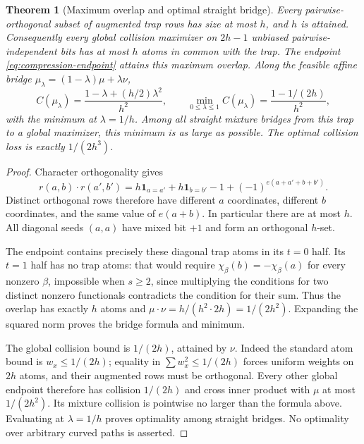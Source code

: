 \documentclass[11pt]{article}
\newtheorem{theorem}{Theorem}[section]
\begin{document}
\begin{theorem}[Maximum overlap and optimal straight bridge]
\label{thm:compression-optimal-overlap}
Every pairwise-orthogonal subset of augmented trap rows has size at most
$h$, and $h$ is attained. Consequently every global collision maximizer
on $2h-1$ unbiased pairwise-independent bits has at most $h$ atoms in
common with the trap. The endpoint \eqref{eq:compression-endpoint}
attains this maximum overlap. Along the feasible affine bridge
$\mu_\lambda=(1-\lambda)\mu+\lambda\nu$,
\[
 C(\mu_\lambda)=\frac{1-\lambda+(h/2)\lambda^2}{h^2},\qquad
 \min_{0\le\lambda\le1}C(\mu_\lambda)
 =\frac{1-1/(2h)}{h^2},
\]
with the minimum at $\lambda=1/h$.
Among all straight mixture bridges from this trap to a global maximizer,
this minimum is as large as possible. The optimal collision loss is
exactly $1/(2h^3)$.
\end{theorem}
\begin{proof}
Character orthogonality gives
\[
 r(a,b)\cdot r(a',b')=
 h\mathbf1_{a=a'}+h\mathbf1_{b=b'}-1+
 (-1)^{e(a+a'+b+b')}.
\]
Distinct orthogonal rows therefore have different $a$ coordinates,
different $b$ coordinates, and the same value of $e(a+b)$.
In particular there are at most $h$. All diagonal seeds $(a,a)$ have
mixed bit $+1$ and form an orthogonal $h$-set.

The endpoint contains precisely these diagonal trap atoms in its $t=0$
half. Its $t=1$ half has no trap atoms: that would require
$\chi_\beta(b)=-\chi_\beta(a)$ for every nonzero $\beta$, impossible
when $s\ge2$, since multiplying the conditions for two distinct nonzero
functionals contradicts the condition for their sum. Thus the overlap
has exactly $h$ atoms and
$\mu\cdot\nu=h/(h^2\cdot2h)=1/(2h^2)$.
Expanding the squared norm proves the bridge formula and minimum.

The global collision bound is $1/(2h)$, attained by $\nu$. Indeed the
standard atom bound is $w_x\le1/(2h)$; equality in
$\sum w_x^2\le1/(2h)$ forces uniform weights on $2h$ atoms, and their
augmented rows must be orthogonal. Every other global endpoint therefore
has collision $1/(2h)$ and cross inner product with $\mu$ at most
$1/(2h^2)$. Its mixture collision is pointwise no larger than the
formula above. Evaluating at $\lambda=1/h$ proves optimality among
straight bridges. No optimality over arbitrary curved paths is asserted.
\end{proof}
\end{document}
